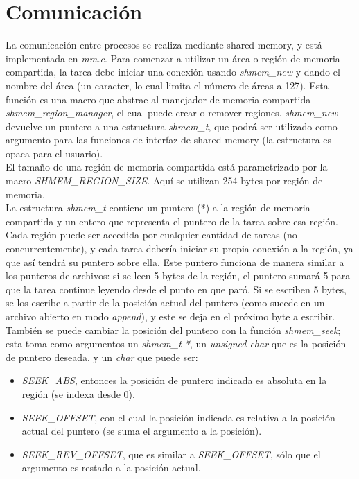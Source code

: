 \documentclass[a4paper]{article}
\begin{document}
\section{Comunicación}
La comunicación entre procesos se realiza mediante shared memory, y
está implementada en \textit{mm.c}. Para comenzar a utilizar un área
o región de memoria compartida, la tarea debe iniciar una conexión
usando \textit{shmem\_new} y dando el nombre del área (un caracter,
lo cual limita el número de áreas a 127). Esta función es una macro
que abstrae al manejador de memoria compartida
\textit{shmem\_region\_manager}, el cual puede crear o remover
regiones. \textit{shmem\_new} devuelve un puntero a una estructura
\textit{shmem\_t}, que podrá ser utilizado como argumento para las
funciones de interfaz de shared memory (la estructura es opaca para
el usuario). \\
El tamaño de una región de memoria compartida está parametrizado
por la macro \textit{SHMEM\_REGION\_SIZE}. Aquí se utilizan 254
bytes por región de memoria. \\
La estructura \textit{shmem\_t} contiene un puntero (*) a la región
de memoria compartida y un entero que representa el puntero de la
tarea sobre esa región. Cada región puede ser accedida por
cualquier cantidad de tareas (no concurrentemente), y cada tarea
debería iniciar su propia conexión a la región, ya que así tendrá
su puntero sobre ella. Este puntero funciona de manera similar a
los punteros de archivos: si se leen 5 bytes de la región, el
puntero sumará 5 para que la tarea continue leyendo desde el punto
en que paró. Si se escriben 5 bytes, se los escribe a partir de la
posición actual del puntero (como sucede en un archivo abierto en
modo \textit{append}), y este se deja en el próximo byte a
escribir. También se puede cambiar la posición del puntero con la
función \textit{shmem\_seek}; esta toma como argumentos un 
\textit{shmem\_t *}, un \textit{unsigned char} que es la posición
de puntero deseada, y un \textit{char} que puede ser:
\begin{itemize}
    \item \textit{SEEK\_ABS}, entonces la posición de puntero
    indicada es absoluta en la región (se indexa desde 0).
    \item \textit{SEEK\_OFFSET}, con el cual la posición indicada
    es relativa a la posición actual del puntero (se suma el
    argumento a la posición).
    \item \textit{SEEK\_REV\_OFFSET}, que es similar a
    \textit{SEEK\_OFFSET}, sólo que el argumento es restado a la
    posición actual.
\end{itemize}
\end{document}
